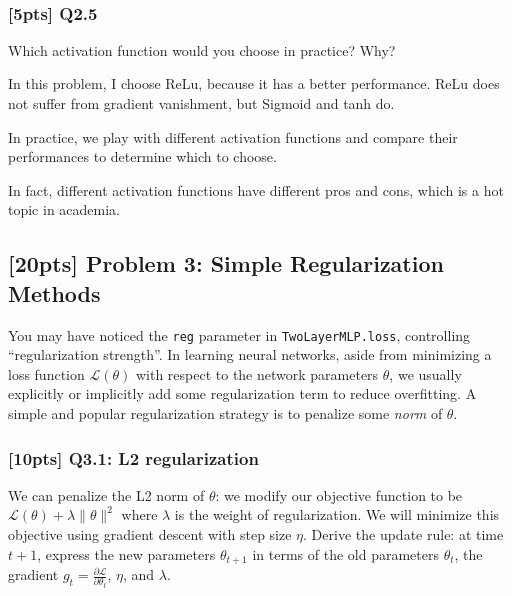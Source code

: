\documentclass[11pt]{article}
\begin{document}
    \begin{center}
    \end{center}
    { \hspace*{\fill} \\}
    
    \hypertarget{pts-q2.5}{%
\subsubsection{{[}5pts{]} Q2.5}\label{pts-q2.5}}

Which activation function would you choose in practice? Why?

    In this problem, I choose ReLu, because it has a better performance.
ReLu does not suffer from gradient vanishment, but Sigmoid and tanh do.

In practice, we play with different activation functions and compare
their performances to determine which to choose.

In fact, different activation functions have different pros and cons,
which is a hot topic in academia.

    \hypertarget{pts-problem-3-simple-regularization-methods}{%
\subsection{{[}20pts{]} Problem 3: Simple Regularization
Methods}\label{pts-problem-3-simple-regularization-methods}}

You may have noticed the \texttt{reg} parameter in
\texttt{TwoLayerMLP.loss}, controlling ``regularization strength''. In
learning neural networks, aside from minimizing a loss function
\(\mathcal{L}(\theta)\) with respect to the network parameters
\(\theta\), we usually explicitly or implicitly add some regularization
term to reduce overfitting. A simple and popular regularization strategy
is to penalize some \emph{norm} of \(\theta\).

    \hypertarget{pts-q3.1-l2-regularization}{%
\subsubsection{{[}10pts{]} Q3.1: L2
regularization}\label{pts-q3.1-l2-regularization}}

We can penalize the L2 norm of \(\theta\): we modify our objective
function to be \(\mathcal{L}(\theta) + \lambda \|\theta\|^2\) where
\(\lambda\) is the weight of regularization. We will minimize this
objective using gradient descent with step size \(\eta\). Derive the
update rule: at time \(t+1\), express the new parameters
\(\theta_{t+1}\) in terms of the old parameters \(\theta_t\), the
gradient \(g_t=\frac{\partial \mathcal{L}}{\partial \theta_t}\),
\(\eta\), and \(\lambda\).
\end{document}
